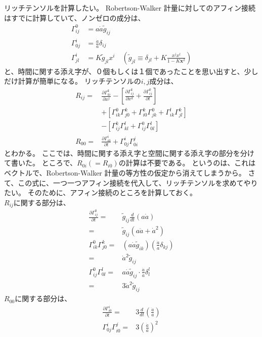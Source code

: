 \documentclass[11pt,a4paper,dvipdfmx]{jsarticle}
\theoremstyle{plain}
\theoremstyle{break}
\newcommand{\tilg}{\tilde{g}}
\begin{document}
リッチテンソルを計算したい。
Robertson-Walker 計量に対してのアフィン接続はすでに計算していて、ノンゼロの成分は、
\begin{align}
  \Gamma^{0}_{ij} &= a \dot{a} \tilde{g}_{ij} \\
  \Gamma^{i}_{0j} &= \frac{\dot{a}}{a} \delta_{ij} \\
  \Gamma^{i}_{jl} &= K \tilg_{jl} x^i \quad (\tilg_{jl} \equiv \delta_{jl}+K \frac{x^{j} x^{l}}{1-K \mathbf{x}^{2}} ) 
\end{align}
と、時間に関する添え字が、０個もしくは１個であったことを思い出すと、少しだけ計算が簡単になる。
リッチテンソルの$i,j$成分は、
\begin{align}
  R_{i j}=& \frac{\partial \Gamma_{k i}^{k}}{\partial x^{j}}-\left[\frac{\partial \Gamma_{i j}^{k}}{\partial x^{k}}+\frac{\partial \Gamma_{i j}^{0}}{\partial t}\right] \\
  & +\left[\Gamma_{i k}^{0} \Gamma_{j 0}^{k}+\Gamma_{i 0}^{k} \Gamma_{j k}^{0}+\Gamma_{i k}^{l} \Gamma_{j l}^{k}\right] \\
  &-\left[\Gamma_{i j}^{k} \Gamma_{k l}^{l}+\Gamma_{i j}^{0} \Gamma_{0 l}^{l}\right] \\
  R_{00}=&\frac{\partial \Gamma_{i 0}^{i}}{\partial t}+\Gamma_{0 j}^{i} \Gamma_{0 i}^{j}
\end{align}
とわかる。
ここでは、時間に関する添え字と空間に関する添え字の部分を分けて書いた。
ところで、$R_{0 i} ( = R_{i 0})$の計算は不要である。
というのは、これはベクトルで、Robertson-Walker 計量の等方性の仮定から消えてしまうから。
さて、この式に、一つ一つアフィン接続を代入して、リッチテンソルを求めてやりたい。
そのために、アフィン接続のところを計算しておく。\\
$R_{ij}$に関する部分は、
\begin{align}
  \frac{\partial \Gamma_{i j}^{0}}{\partial t}
  	=&\tilde{g}_{i j} \frac{d}{d t}(a \dot{a}) \\
  	=&\tilde{g}_{i j} (a \ddot{a} + \dot{a}^2) \\
   \Gamma^{0}_{i k} \Gamma^{k}_{j0}
   	=& (a \dot{a} \tilde{g}_{ik}) (\frac{\dot{a}}{a} \delta_{kj}) \\
	=& \dot{a}^2 \tilde{g}_{ij}\\
  \Gamma_{i j}^{0} \Gamma_{0 l}^{l}
  	=& a \dot{a} \tilg_{ij} \cdot  \frac{\dot{a}}{a} \delta^{l}_{l} \\
	=&3 \dot{a}^2 \tilg_{ij}
\end{align}
$R_{00}$に関する部分は、
\begin{align}
\frac{\partial \Gamma_{i 0}^{i}}{\partial t}
	=& 3 \frac{d}{d t}\left(\frac{\dot{a}}{a}\right) \\
\Gamma_{0 j}^{i} \Gamma_{i 0}^{j}
	=&3\left(\frac{\dot{a}}{a}\right)^{2}
\end{align}
\end{document}
